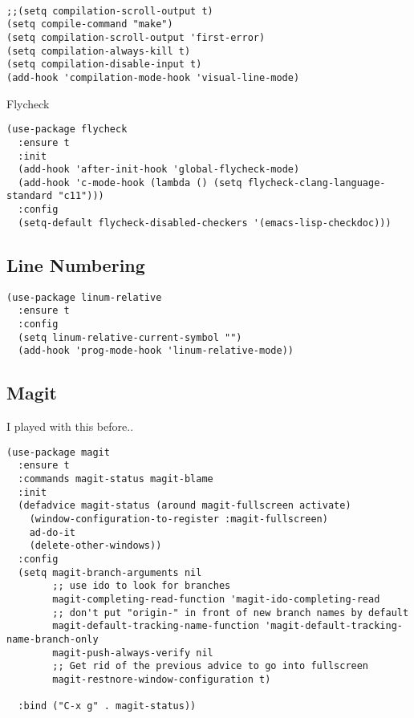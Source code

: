 \documentclass[12pt]{article}
\begin{document}
\begin{verbatim}

;;(setq compilation-scroll-output t)
(setq compile-command "make")
(setq compilation-scroll-output 'first-error)
(setq compilation-always-kill t)
(setq compilation-disable-input t)
(add-hook 'compilation-mode-hook 'visual-line-mode)

\end{verbatim}

Flycheck 
\begin{verbatim}
(use-package flycheck
  :ensure t
  :init
  (add-hook 'after-init-hook 'global-flycheck-mode)
  (add-hook 'c-mode-hook (lambda () (setq flycheck-clang-language-standard "c11")))
  :config
  (setq-default flycheck-disabled-checkers '(emacs-lisp-checkdoc)))

\end{verbatim}

\subsection{Line Numbering}
\label{sec:orgb2d9e82}

\begin{verbatim}
(use-package linum-relative
  :ensure t
  :config
  (setq linum-relative-current-symbol "")
  (add-hook 'prog-mode-hook 'linum-relative-mode))
\end{verbatim}

\subsection{Magit}
\label{sec:orgcfaee21}

I played with this before.. 

\begin{verbatim}
(use-package magit
  :ensure t
  :commands magit-status magit-blame
  :init
  (defadvice magit-status (around magit-fullscreen activate)
    (window-configuration-to-register :magit-fullscreen)
    ad-do-it
    (delete-other-windows))
  :config
  (setq magit-branch-arguments nil
        ;; use ido to look for branches
        magit-completing-read-function 'magit-ido-completing-read
        ;; don't put "origin-" in front of new branch names by default
        magit-default-tracking-name-function 'magit-default-tracking-name-branch-only
        magit-push-always-verify nil
        ;; Get rid of the previous advice to go into fullscreen
        magit-restnore-window-configuration t)

  :bind ("C-x g" . magit-status))

\end{verbatim}
\end{document}
